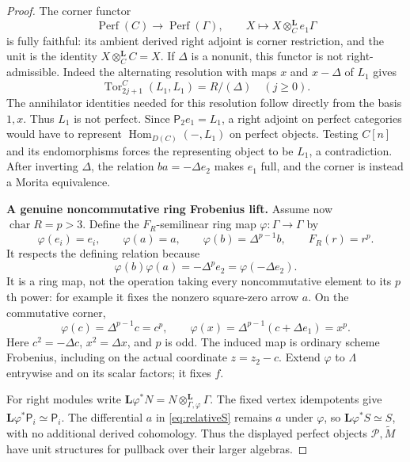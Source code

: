 \begin{proof}
The corner functor
\[
 \operatorname{Perf}(C)\longrightarrow\operatorname{Perf}(\Gamma),
 \qquad X\longmapsto X\otimes_C^{\mathbf L}e_1\Gamma
\]
is fully faithful: its ambient derived right adjoint is
corner restriction, and the unit is the identity
$X\otimes_C^{\mathbf L}C=X$.
If $\Delta$ is a nonunit, this functor is not
right-admissible. Indeed the alternating resolution
with maps $x$ and $x-\Delta$ of $L_1$ gives
\[
 \operatorname{Tor}_{2j+1}^C(L_1,L_1)=R/(\Delta)
       \quad(j\ge0).
\]
The annihilator identities needed for this resolution
follow directly from the basis $1,x$. Thus $L_1$ is
not perfect. Since $\mathsf P_2e_1=L_1$, a right
adjoint on perfect categories would have to represent
$\operatorname{Hom}_{D(C)}(-,L_1)$ on perfect objects.
Testing $C[n]$ and its endomorphisms forces the
representing object to be $L_1$, a contradiction.
After inverting $\Delta$, the relation
$ba=-\Delta e_2$ makes $e_1$ full, and the corner
is instead a Morita equivalence.

\par\smallskip\noindent\textbf{A genuine noncommutative ring Frobenius lift.}\quad
Assume now $\operatorname{char}R=p>3$. Define the
$F_R$-semilinear ring map $\varphi:\Gamma\to\Gamma$ by
\begin{equation}\label{eq:relativefrobenius}
 \varphi(e_i)=e_i,\qquad
 \varphi(a)=a,\qquad
 \varphi(b)=\Delta^{p-1}b,\qquad F_R(r)=r^p.
\end{equation}
It respects the defining relation because
\[
 \varphi(b)\varphi(a)
       =-\Delta^p e_2=\varphi(-\Delta e_2).
\]
It is a ring map, not the operation taking every
noncommutative element to its $p$th power: for example
it fixes the nonzero square-zero arrow $a$.
On the commutative corner,
\[
 \varphi(c)=\Delta^{p-1}c=c^p,\qquad
 \varphi(x)=\Delta^{p-1}(c+\Delta e_1)=x^p.
\]
Here $c^2=-\Delta c$, $x^2=\Delta x$, and $p$ is odd.
The induced map is ordinary scheme Frobenius, including
on the actual coordinate $z=z_2-c$. Extend $\varphi$
to $\Lambda$ entrywise and on its scalar factors; it
fixes $f$.

For right modules write
$\mathbf L\varphi^*N=N\otimes_{\Gamma,\varphi}^{\mathbf L}\Gamma$.
The fixed vertex idempotents give
$\mathbf L\varphi^*\mathsf P_i\simeq\mathsf P_i$.
The differential $a$ in \eqref{eq:relativeS} remains
$a$ under $\varphi$, so
$\mathbf L\varphi^*S\simeq S$, with no additional
derived cohomology. Thus the displayed perfect objects
$\mathcal P,\widetilde M$ have unit structures for
pullback over their larger algebras.


\end{proof}
